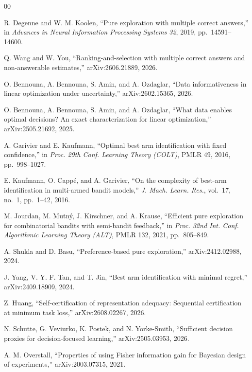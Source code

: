 \begin{thebibliography}{00}

 R. Degenne and W. M. Koolen, ``Pure exploration with multiple correct
answers,'' in \emph{Advances in Neural Information Processing Systems 32}, 2019,
pp.~14591--14600.

 Q. Wang and W. You, ``Ranking-and-selection with multiple correct
answers and non-answerable estimates,'' arXiv:2606.21889, 2026.

 O. Bennouna, A. Bennouna, S. Amin, and A. Ozdaglar, ``Data
informativeness in linear optimization under uncertainty,'' arXiv:2602.15365, 2026.

 O. Bennouna, A. Bennouna, S. Amin, and A. Ozdaglar, ``What data enables
optimal decisions? An exact characterization for linear optimization,'' arXiv:2505.21692, 2025.

 A. Garivier and E. Kaufmann, ``Optimal best arm identification with
fixed confidence,'' in \emph{Proc. 29th Conf. Learning Theory (COLT)}, PMLR 49, 2016,
pp.~998--1027.

 E. Kaufmann, O. Capp\'e, and A. Garivier, ``On the complexity of
best-arm identification in multi-armed bandit models,'' \emph{J. Mach. Learn. Res.}, vol.~17,
no.~1, pp.~1--42, 2016.

 M. Jourdan, M. Mutn\'y, J. Kirschner, and A. Krause, ``Efficient pure
exploration for combinatorial bandits with semi-bandit feedback,'' in \emph{Proc. 32nd Int.
Conf. Algorithmic Learning Theory (ALT)}, PMLR 132, 2021, pp.~805--849.

 A. Shukla and D. Basu, ``Preference-based pure exploration,''
arXiv:2412.02988, 2024.

 J. Yang, V. Y. F. Tan, and T. Jin, ``Best arm identification with minimal
regret,'' arXiv:2409.18909, 2024.

 Z. Huang, ``Self-certification of representation adequacy: Sequential
certification at minimum task loss,'' arXiv:2608.02267, 2026.

 N. Schutte, G. Veviurko, K. Postek, and N. Yorke-Smith, ``Sufficient
decision proxies for decision-focused learning,'' arXiv:2505.03953, 2026.

 A. M. Overstall, ``Properties of using Fisher information gain for
Bayesian design of experiments,'' arXiv:2003.07315, 2021.


\end{thebibliography}
